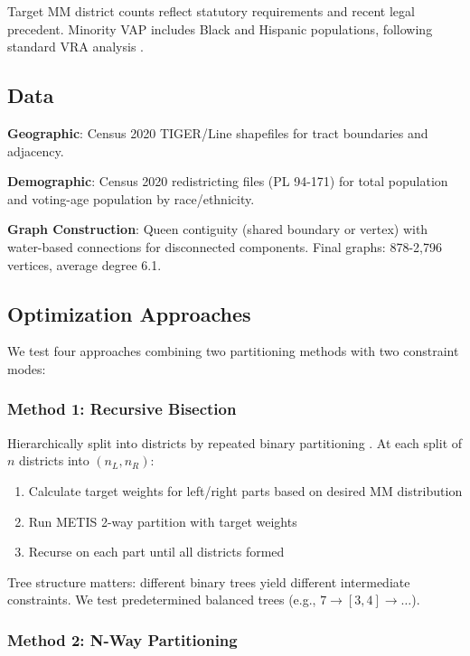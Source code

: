 Target MM district counts reflect statutory requirements and recent legal precedent. Minority VAP includes Black and Hispanic populations, following standard VRA analysis \citep{katz2020}.

\subsection{Data}

\textbf{Geographic}: Census 2020 TIGER/Line shapefiles for tract boundaries and adjacency.

\textbf{Demographic}: Census 2020 redistricting files (PL 94-171) for total population and voting-age population by race/ethnicity.

\textbf{Graph Construction}: Queen contiguity (shared boundary or vertex) with water-based connections for disconnected components. Final graphs: 878-2,796 vertices, average degree 6.1.

\subsection{Optimization Approaches}

We test four approaches combining two partitioning methods with two constraint modes:

\subsubsection{Method 1: Recursive Bisection}

Hierarchically split into districts by repeated binary partitioning \citep{dellaLibera2026recursive}. At each split of $n$ districts into $(n_L, n_R)$:

\begin{enumerate}
\item Calculate target weights for left/right parts based on desired MM distribution
\item Run METIS 2-way partition with target weights
\item Recurse on each part until all districts formed
\end{enumerate}

Tree structure matters: different binary trees yield different intermediate constraints. We test predetermined balanced trees (e.g., $7 \to [3,4] \to \ldots$).

\subsubsection{Method 2: N-Way Partitioning}

